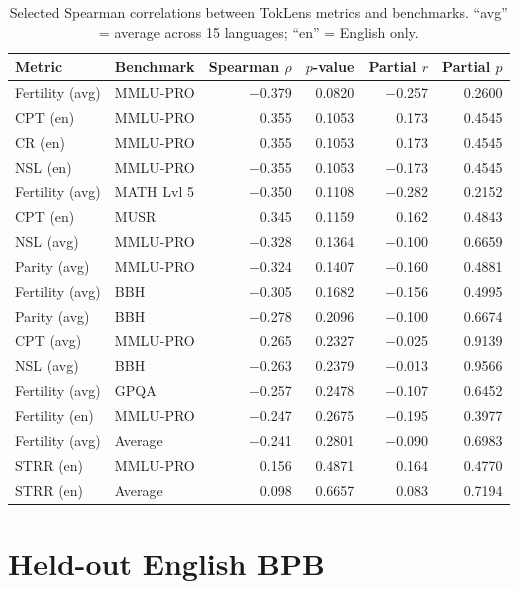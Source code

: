 \documentclass[11pt]{article}
\begin{document}
\begin{table}[H]
\centering
\small
\begin{tabular}{llrrrr}
\toprule
\textbf{Metric} & \textbf{Benchmark} & \textbf{Spearman $\rho$} & \textbf{$p$-value} & \textbf{Partial $r$} & \textbf{Partial $p$} \\
\midrule
Fertility (avg) & MMLU-PRO & $-$0.379 & 0.0820 & $-$0.257 & 0.2600 \\
CPT (en) & MMLU-PRO & 0.355 & 0.1053 & 0.173 & 0.4545 \\
CR (en) & MMLU-PRO & 0.355 & 0.1053 & 0.173 & 0.4545 \\
NSL (en) & MMLU-PRO & $-$0.355 & 0.1053 & $-$0.173 & 0.4545 \\
Fertility (avg) & MATH Lvl 5 & $-$0.350 & 0.1108 & $-$0.282 & 0.2152 \\
CPT (en) & MUSR & 0.345 & 0.1159 & 0.162 & 0.4843 \\
NSL (avg) & MMLU-PRO & $-$0.328 & 0.1364 & $-$0.100 & 0.6659 \\
Parity (avg) & MMLU-PRO & $-$0.324 & 0.1407 & $-$0.160 & 0.4881 \\
Fertility (avg) & BBH & $-$0.305 & 0.1682 & $-$0.156 & 0.4995 \\
Parity (avg) & BBH & $-$0.278 & 0.2096 & $-$0.100 & 0.6674 \\
CPT (avg) & MMLU-PRO & 0.265 & 0.2327 & $-$0.025 & 0.9139 \\
NSL (avg) & BBH & $-$0.263 & 0.2379 & $-$0.013 & 0.9566 \\
Fertility (avg) & GPQA & $-$0.257 & 0.2478 & $-$0.107 & 0.6452 \\
Fertility (en) & MMLU-PRO & $-$0.247 & 0.2675 & $-$0.195 & 0.3977 \\
Fertility (avg) & Average & $-$0.241 & 0.2801 & $-$0.090 & 0.6983 \\
STRR (en) & MMLU-PRO & 0.156 & 0.4871 & 0.164 & 0.4770 \\
STRR (en) & Average & 0.098 & 0.6657 & 0.083 & 0.7194 \\
\bottomrule
\end{tabular}
\caption{Selected Spearman correlations between TokLens metrics and benchmarks. ``avg'' = average across 15 languages; ``en'' = English only.}
\label{tab:full_corr}
\end{table}

\section{Held-out English BPB}
\label{app:bpb}
\end{document}
